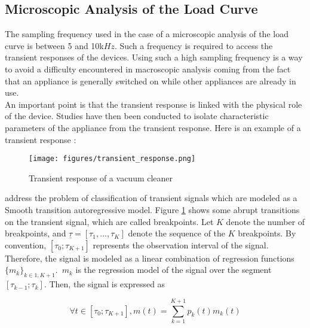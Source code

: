 
\subsection{Microscopic Analysis of the Load Curve}
The sampling frequency used in the case of a microscopic analysis of the load curve is between 5 and 10k$Hz$. Such a frequency is required to access the transient responses of the devices. Using such a high sampling frequency is a way to avoid a difficulty encountered in macroscopic analysis coming from the fact that an appliance is generally switched on while other appliances are already in use.
\\

An important point is that the transient response is linked with the physical role of the device. Studies have then been conducted to isolate characteristic parameters of the appliance from the transient response. Here is an example of a transient response :
\\

\begin{figure}[H]
\centering
\texttt{[image: figures/transient\_response.png]}
\caption{Transient response of a vacuum cleaner}
\label{fig:transient_response}
\end{figure}


\cite{research2} address the problem of classification of transient signals which are modeled as a Smooth transition autoregressive model. Figure \ref{fig:transient_response} shows some abrupt transitions on the transient signal, which are called breakpoints. Let $K$ denote the number of breakpoints, and $\underline{\tau} = [\tau_1,...,\tau_K]$ denote the sequence of the $K$ breakpoints. By convention, $[\tau_0;\tau_{K+1}]$ represents the observation interval of the signal.
\\

 Therefore, the signal is modeled as a linear combination of regression functions $\{m_k\}_{k\in{1,K+1}}$.~$m_k$ is the regression model of the signal over the segment $[\tau_{k-1};\tau_{k}]$. Then, the signal is expressed as

\begin{equation}
\forall t\in [\tau_0;\tau_{K+1}],m(t)= \sum_{k=1}^{K+1}p_k(t)m_k(t)
\end{equation}

